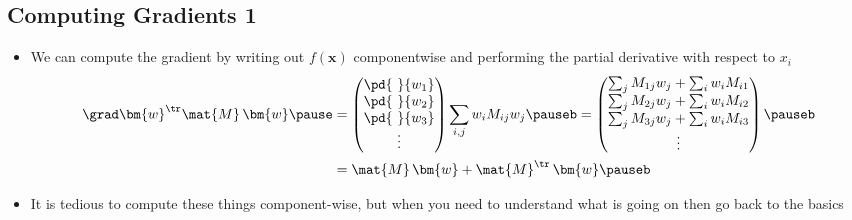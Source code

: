 \begin{slide}
\section{Computing Gradients 1}

\begin{PauseHighLight}
  \begin{itemize}
  \item We can compute the gradient by writing out $f(\bm{x})$
    componentwise and performing the partial derivative with respect
    to $x_i$\pause
    \begin{align*}
      \grad \bm{w}^\tr \mat{M}\, \bm{w}\pause &=
      \begin{pmatrix}
        \pd{\ }{w_1} \\  \pd{\ }{w_2} \\  \pd{\ }{w_3} \\ \vdots
      \end{pmatrix}
      \sum_{i,j} w_i M_{ij} w_j \pauseb =
      \begin{pmatrix}
        \sum_j M_{1j} w_j + \sum_i w_i M_{i1} \\
        \sum_j M_{2j} w_j + \sum_i w_i M_{i2} \\
        \sum_j M_{3j} w_j + \sum_i w_i M_{i3} \\ \vdots
      \end{pmatrix} \pauseb\\
      &= \mat{M}\, \bm{w} + \mat{M}^\tr\, \bm{w}\pauseb
    \end{align*}
  \item It is tedious to compute these things component-wise, but when
    you need to understand what is going on then go back to the basics\pauseb
  \end{itemize}
\end{PauseHighLight}
  

\end{slide}




